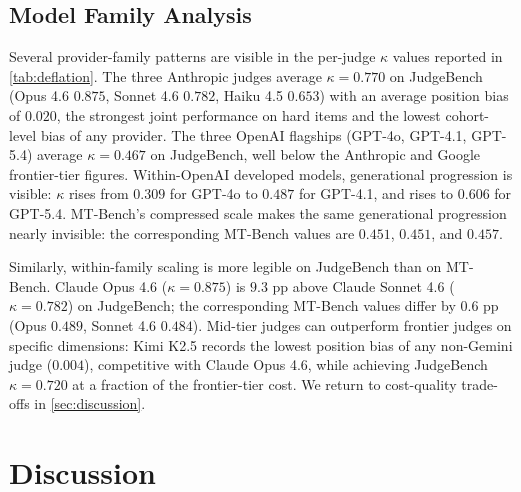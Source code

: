 \documentclass[11pt]{article}
\begin{document}
\subsection{Model Family Analysis}


Several provider-family patterns are visible in the per-judge $\kappa$ values reported in \autoref{tab:deflation}. The three Anthropic judges average $\kappa = 0.770$ on JudgeBench (Opus 4.6 $0.875$, Sonnet 4.6 $0.782$, Haiku 4.5 $0.653$) with an average position bias of $0.020$, the strongest joint performance on hard items and the lowest cohort-level bias of any provider. The three OpenAI flagships (GPT-4o, GPT-4.1, GPT-5.4) average $\kappa = 0.467$ on JudgeBench, well below the Anthropic and Google frontier-tier figures. Within-OpenAI developed models, generational progression is visible: $\kappa$ rises from $0.309$ for GPT-4o to $0.487$ for GPT-4.1, and rises to $0.606$ for GPT-5.4. MT-Bench's compressed scale makes the same generational progression nearly invisible: the corresponding MT-Bench values are $0.451$, $0.451$, and $0.457$. 

Similarly, within-family scaling is more legible on JudgeBench than on MT-Bench. Claude Opus 4.6 ($\kappa = 0.875$) is $9.3$ pp above Claude Sonnet 4.6 ($\kappa = 0.782$) on JudgeBench; the corresponding MT-Bench values differ by $0.6$ pp (Opus $0.489$, Sonnet 4.6 $0.484$). Mid-tier judges can outperform frontier judges on specific dimensions: Kimi K2.5 records the lowest position bias of any non-Gemini judge ($0.004$), competitive with Claude Opus 4.6, while achieving JudgeBench $\kappa = 0.720$ at a fraction of the frontier-tier cost. We return to cost-quality trade-offs in \autoref{sec:discussion}.

\section{Discussion}
\label{sec:discussion}
\end{document}
